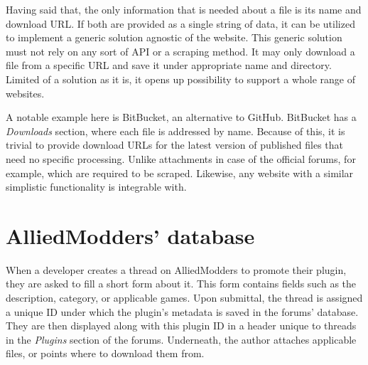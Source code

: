 Having said that, the only information that is needed about a file is its name and download URL.
If both are provided as a single string of data, it can be utilized to implement a generic solution agnostic of the website.
This generic solution must not rely on any sort of API or a scraping method.
It may only download a file from a specific URL and save it under appropriate name and directory.
Limited of a solution as it is, it opens up possibility to support a whole range of websites.

A notable example here is BitBucket, an alternative to GitHub.
BitBucket has a \textit{Downloads} section, where each file is addressed by name.
Because of this, it is trivial to provide download URLs for the latest version of published files that need no specific processing.
Unlike attachments in case of the official forums, for example, which are required to be scraped.
Likewise, any website with a similar simplistic functionality is integrable with.

\section{AlliedModders' database}

When a developer creates a thread on AlliedModders to promote their plugin, they are asked to fill a short form about it.
This form contains fields such as the description, category, or applicable games.
Upon submittal, the thread is assigned a unique ID under which the plugin's metadata is saved in the forums' database.
They are then displayed along with this plugin ID in a header unique to threads in the \textit{Plugins} section of the forums.
Underneath, the author attaches applicable files, or points where to download them from.

